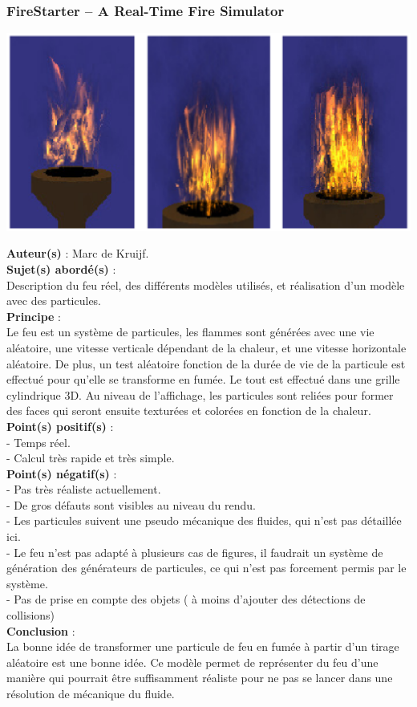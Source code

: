 \documentclass[a4paper,10pt]{article}
\begin{document}
\subsubsection{FireStarter – A Real-Time Fire Simulator}
    \begin{center}
	\includegraphics[scale=0.5]{FireStarter.ps}
    \end{center}
\textbf{Auteur(s)} : Marc de Kruijf.\\
\textbf{Sujet(s) abordé(s)} : \\ 
	Description du feu réel, des différents modèles utilisés, et réalisation d'un modèle avec des particules.\\
\textbf{Principe} :\\	
	Le feu est un système de particules, les flammes sont générées avec une vie aléatoire, une vitesse verticale dépendant de la chaleur, et une vitesse horizontale aléatoire. De plus, un test aléatoire fonction de la durée de vie de la particule est effectué pour qu'elle se transforme en fumée. Le tout est effectué dans une grille cylindrique 3D. Au niveau de l'affichage, les particules sont reliées pour former des faces qui seront ensuite texturées et colorées en fonction de la chaleur.\\
\textbf{Point(s) positif(s)} :\\
	- Temps réel.\\
	- Calcul très rapide et très simple.\\
\textbf{Point(s) négatif(s)} :\\
	- Pas très réaliste actuellement.\\
	- De gros défauts sont visibles au niveau du rendu.\\
	- Les particules suivent une pseudo mécanique des fluides, qui n'est pas détaillée ici.\\
	- Le feu n'est pas adapté à plusieurs cas de figures, il faudrait un système de génération des générateurs de particules, ce qui n'est pas forcement permis par le système.\\
	- Pas de prise en compte des objets ( à moins d'ajouter des détections de collisions)\\
\textbf{Conclusion} :\\
	La bonne idée de transformer une particule de feu en fumée à partir d'un tirage aléatoire est une bonne idée. Ce modèle permet de représenter du feu d'une manière qui pourrait être suffisamment réaliste pour ne pas se lancer dans une résolution de mécanique du fluide.\\
\end{document}
